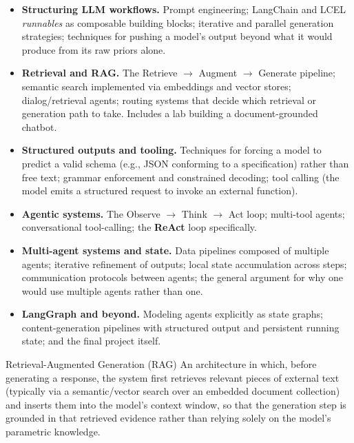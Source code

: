 \begin{itemize}
    \item \textbf{Structuring LLM workflows.} Prompt engineering; LangChain and LCEL \emph{runnables} as composable building blocks; iterative and parallel generation strategies; techniques for pushing a model's output beyond what it would produce from its raw priors alone.

    \vspace{0.2cm}
    \item \textbf{Retrieval and RAG.} The Retrieve $\rightarrow$ Augment $\rightarrow$ Generate pipeline; semantic search implemented via embeddings and vector stores; dialog/retrieval agents; routing systems that decide which retrieval or generation path to take. Includes a lab building a document-grounded chatbot.

    \vspace{0.2cm}
    \item \textbf{Structured outputs and tooling.} Techniques for forcing a model to predict a valid schema (e.g., JSON conforming to a specification) rather than free text; grammar enforcement and constrained decoding; tool calling (the model emits a structured request to invoke an external function).

    \vspace{0.2cm}
    \item \textbf{Agentic systems.} The Observe $\rightarrow$ Think $\rightarrow$ Act loop; multi-tool agents; conversational tool-calling; the \textbf{ReAct} loop specifically.

    \vspace{0.2cm}
    \item \textbf{Multi-agent systems and state.} Data pipelines composed of multiple agents; iterative refinement of outputs; local state accumulation across steps; communication protocols between agents; the general argument for why one would use multiple agents rather than one.

    \vspace{0.2cm}
    \item \textbf{LangGraph and beyond.} Modeling agents explicitly as state graphs; content-generation pipelines with structured output and persistent running state; and the final project itself.
\end{itemize}

\begin{defbox}{Retrieval-Augmented Generation (RAG)}
An architecture in which, before generating a response, the system first retrieves relevant pieces of external text (typically via a semantic/vector search over an embedded document collection) and inserts them into the model's context window, so that the generation step is grounded in that retrieved evidence rather than relying solely on the model's parametric knowledge.
\end{defbox}

